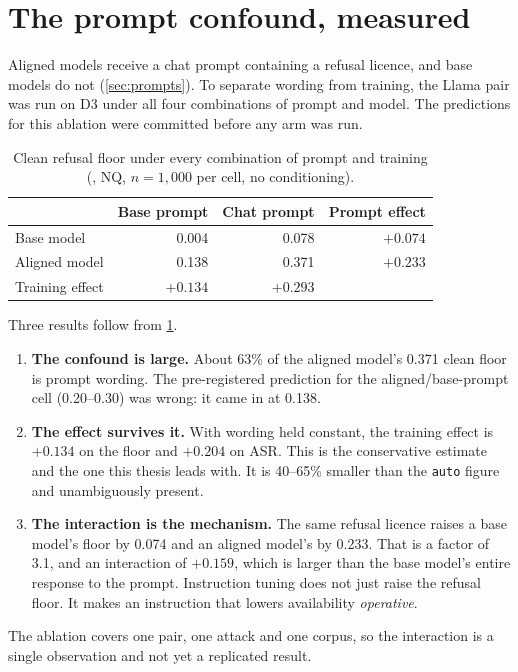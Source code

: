 \section{The prompt confound, measured}
\label{sec:res-prompt}

Aligned models receive a chat prompt containing a refusal licence, and base
models do not (\cref{sec:prompts}). To separate wording from training, the
Llama pair was run on D3 under all four combinations of prompt and model. The
predictions for this ablation were committed before any arm was run.

\begin{table}[ht]
\centering
\small
\caption[Prompt $\times$ training]{Clean refusal floor under every combination
of prompt and training (, NQ, $n=1{,}000$ per cell, no
conditioning).}
\label{tab:twobytwo}
\begin{tabular}{@{}lrrr@{}}
\toprule
& Base prompt & Chat prompt & Prompt effect \\
\midrule
Base model    & 0.004 & 0.078 & $+0.074$ \\
Aligned model & 0.138 & 0.371 & $+0.233$ \\
\midrule
Training effect & $\mathbf{+0.134}$ & $+0.293$ & \\
\bottomrule
\end{tabular}
\end{table}

Three results follow from \cref{tab:twobytwo}.
\begin{enumerate}
  \item \textbf{The confound is large.} About 63\% of the aligned model's
    0.371 clean floor is prompt wording. The pre-registered prediction for the
    aligned/base-prompt cell (0.20--0.30) was wrong: it came in at 0.138.
  \item \textbf{The effect survives it.} With wording held constant, the
    training effect is $+0.134$ on the floor and $+0.204$ on ASR. This is the
    conservative estimate and the one this thesis leads with. It is 40--65\%
    smaller than the \texttt{auto} figure and unambiguously present.
  \item \textbf{The interaction is the mechanism.} The same refusal licence
    raises a base model's floor by 0.074 and an aligned model's by 0.233. That
    is a factor of 3.1, and an interaction of $+0.159$, which is larger than
    the base model's entire response to the prompt. Instruction tuning does not
    just raise the refusal floor. It makes an instruction that lowers
    availability \emph{operative}.
\end{enumerate}
The ablation covers one pair, one attack and one corpus, so the interaction is
a single observation and not yet a replicated result.

